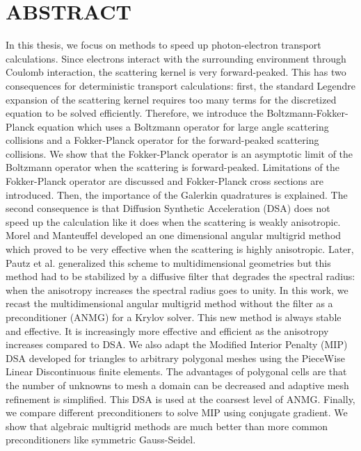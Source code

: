 \chapter*{ABSTRACT}
\pagestyle{plain}
\setcounter{page}{2}
\indent In this thesis, we focus on methods to speed up photon-electron 
transport calculations. Since electrons interact with the surrounding 
environment through Coulomb interaction, the scattering kernel is very 
forward-peaked. This has two consequences for deterministic transport 
calculations: first, the standard Legendre expansion of the scattering 
kernel requires too many terms for the discretized equation to be solved 
efficiently. Therefore, we introduce the Boltzmann-Fokker-Planck equation 
which uses a Boltzmann operator for large angle scattering collisions and 
a Fokker-Planck operator for the forward-peaked scattering collisions. We 
show that the Fokker-Planck operator is an asymptotic limit of the 
Boltzmann operator when the scattering is forward-peaked. Limitations of 
the Fokker-Planck operator are discussed and Fokker-Planck cross sections 
are introduced. Then, the importance of the Galerkin quadratures is 
explained. The second consequence is that Diffusion Synthetic Acceleration 
(DSA) does not speed up the calculation like it does when the scattering 
is weakly anisotropic. Morel and Manteuffel developed an one dimensional 
angular multigrid method which proved to be very effective when the 
scattering is highly anisotropic. Later, Pautz et al. generalized this 
scheme to multidimensional geometries but this method had to be stabilized 
by a diffusive filter that degrades the spectral radius: when the anisotropy 
increases the spectral radius goes to unity. In this work, we recast the 
multidimensional angular multigrid method without the filter as a 
preconditioner (ANMG) for a Krylov solver. This new method is always stable 
and effective. It is increasingly more effective and efficient as the 
anisotropy increases compared to DSA. We also adapt the Modified Interior 
Penalty (MIP) DSA developed for triangles to arbitrary polygonal meshes 
using the PieceWise Linear Discontinuous finite elements. The advantages 
of polygonal cells are that the number of unknowns to mesh a domain can 
be decreased and adaptive mesh refinement is simplified. This DSA is used 
at the coarsest level of ANMG. Finally, we compare different preconditioners 
to solve MIP using conjugate gradient. We show that algebraic multigrid 
methods are much better than more common preconditioners like symmetric
Gauss-Seidel.
\pagebreak{}
